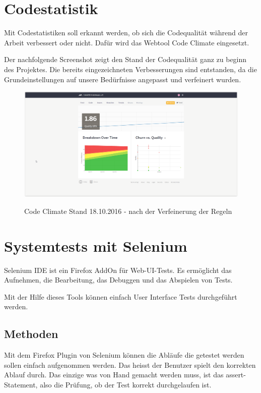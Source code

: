 \section{Codestatistik}
Mit Codestatistiken soll erkannt werden, ob sich die Codequalität während der Arbeit verbessert oder nicht. Dafür wird das Webtool Code Climate eingesetzt.

Der nachfolgende Screenshot zeigt den Stand der Codequalität ganz zu beginn des Projektes. Die bereits eingezeichneten Verbesserungen sind entstanden, da die Grundeinstellungen auf unsere Bedürfnisse angepasst und verfeinert wurden.

\begin{figure}[H]
	\centering
	\includegraphics[width=1\textwidth
	]{Images/Stand_Beginn_181016.PNG}
	\caption{Code Climate Stand 18.10.2016 - nach der Verfeinerung der Regeln}
	\cite{codeclimate.com}
\end{figure}


\section{Systemtests mit Selenium}
Selenium IDE ist ein Firefox AddOn für Web-\acrfull{UI}-Tests. Es ermöglicht das Aufnehmen, die Bearbeitung, das Debuggen und das Abspielen von Tests. 

Mit der Hilfe dieses Tools können einfach \gls{User Interface} Tests durchgeführt werden.

\subsection{Methoden}
Mit dem Firefox Plugin von Selenium können die Abläufe die getestet werden sollen einfach aufgenommen werden. Das heisst der Benutzer spielt den korrekten Ablauf durch. Das einzige was von Hand gemacht werden muss, ist das assert-Statement, also die Prüfung, ob der Test korrekt durchgelaufen ist.


